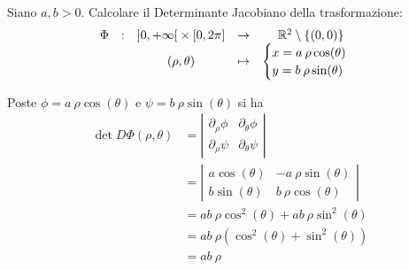 \begin{exercise}
	Siano $a,b > 0$. Calcolare il Determinante Jacobiano della trasformazione:
	\[
		\begin{array}{ccccc} {
			\Phi
		} & : & {
			\left]0,+ \infty\right[ \times \left[0,2 \pi\right]
		} & \to & {
			\mathbb{R}^2 \setminus \left\{(0,0)\right\}
		} \\ & & {
			(\rho, \theta)
		} & \mapsto & {
			\begin{cases}
				x = a \:\rho \cos(\theta)\\
				y = b \:\rho \sin(\theta)
			\end{cases}
		} \\ \end{array}
	\]
	\begin{solution}
		Poste $\phi = a \:\rho \cos(\theta)$ e $\psi = b \:\rho \sin(\theta)$ si ha
		\begin{align*}
			\det D\Phi(\rho, \theta)
			&= \left|
				\begin{matrix}
					\partial_\rho \phi & \partial_\theta \phi\\
					\partial_\rho \psi & \partial_\theta \psi
				\end{matrix}
			\right|\\
			&= \left|
				\begin{matrix}
					a \cos(\theta) & - a \:\rho \sin(\theta)\\
					b \sin(\theta) & b \:\rho \cos(\theta)
				\end{matrix}
			\right|\\
			&= ab \:\rho \cos^2(\theta) + ab \:\rho \sin^2(\theta)\\
			&= ab \:\rho (\cos^2(\theta) + \sin^2(\theta))\\
			&= ab \:\rho
		\end{align*}
	\end{solution}
\end{exercise}
